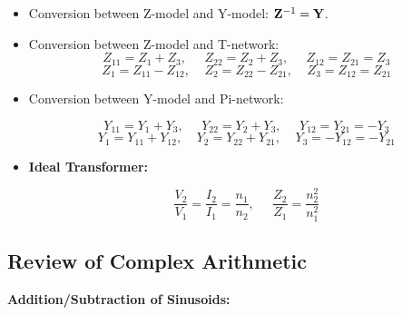 \documentclass{article}
\begin{document}
\begin{itemize}
\item Conversion between Z-model and Y-model: ${\bf Z}^{-1}={\bf Y}$.

\item Conversion between Z-model and T-network:
  \begin{equation}
    Z_{11}=Z_1+Z_3,\;\;\;\;\;Z_{22}=Z_2+Z_3,\;\;\;\;\;Z_{12}=Z_{21}=Z_3	
  \end{equation}
  \begin{equation}
    Z_1=Z_{11}-Z_{12},\;\;\;\;Z_2=Z_{22}-Z_{21},\;\;\;\;Z_3=Z_{12}=Z_{21} 
  \end{equation}

\item Conversion between Y-model and Pi-network:

  \begin{equation} 
    Y_{11}=Y_1+Y_3,\;\;\;\;\;Y_{22}=Y_2+Y_3,\;\;\;\;\;Y_{12}=Y_{21}=-Y_3	
  \end{equation}
  \begin{equation}
    Y_1=Y_{11}+Y_{12},\;\;\;\;Y_2=Y_{22}+Y_{21},\;\;\;\;Y_3=-Y_{12}=-Y_{21} 
  \end{equation}

\item {\bf Ideal Transformer:}

  \begin{equation}	
    \frac{V_2}{V_1}=\frac{I_2}{I_1}=\frac{n_1}{n_2},\;\;\;\;\;
    \frac{Z_2}{Z_1}=\frac{n^2_2}{n^2_1}	
  \end{equation}
\end{itemize}

\subsection*{Review of Complex Arithmetic} 

{\bf Addition/Subtraction of Sinusoids:}
\end{document}
